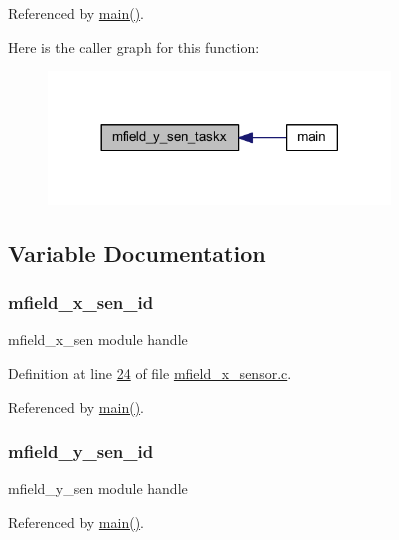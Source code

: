 Referenced by \hyperlink{a00048_source_l00080}{main()}.



Here is the caller graph for this function\+:\nopagebreak
\begin{figure}[H]
\begin{center}
\leavevmode
\includegraphics[width=257pt]{dd/da2/a00019_adfb4e8d328a4cd1c7639082bef5841a9_icgraph}
\end{center}
\end{figure}




\subsection{Variable Documentation}
\hypertarget{a00019_a19a33e680bf19d1aed76750132ed8b64}{
\subsubsection[{mfield\+\_\+x\+\_\+sen\+\_\+id}]{ mfield\+\_\+x\+\_\+sen\+\_\+id}}\label{a00019_a19a33e680bf19d1aed76750132ed8b64}


mfield\+\_\+x\+\_\+sen module handle 



Definition at line \hyperlink{a00050_source_l00024}{24} of file \hyperlink{a00050_source}{mfield\+\_\+x\+\_\+sensor.\+c}.



Referenced by \hyperlink{a00048_source_l00080}{main()}.

\hypertarget{a00019_a99c4ad3cf8b9ce2b67351d6edf48f937}{
\subsubsection[{mfield\+\_\+y\+\_\+sen\+\_\+id}]{ mfield\+\_\+y\+\_\+sen\+\_\+id}}\label{a00019_a99c4ad3cf8b9ce2b67351d6edf48f937}


mfield\+\_\+y\+\_\+sen module handle 



Referenced by \hyperlink{a00048_source_l00080}{main()}.

